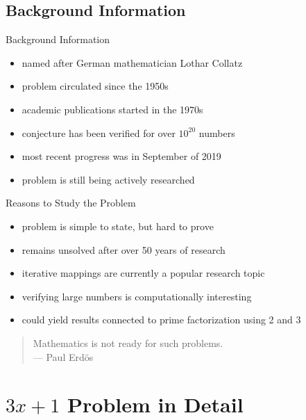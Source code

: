 \documentclass[hyperref={colorlinks,allcolors=black}]{beamer}
\begin{document}

\subsection[Background]{Background Information}

\begin{frame}{Background Information}
\begin{itemize}
    \item named after German mathematician Lothar Collatz
    \item problem circulated since the 1950s
    \item academic publications started in the 1970s
    \item conjecture has been verified for over $10^{20}$ numbers
    \item most recent progress was in September of 2019
    \item problem is still being actively researched
\end{itemize}
\end{frame}


\begin{frame}{Reasons to Study the Problem}
\begin{itemize}
    \item problem is simple to state, but hard to prove
    \item remains unsolved after over 50 years of research
    \item iterative mappings are currently a popular research topic
    \item verifying large numbers is computationally interesting
    \item could yield results connected to prime factorization using 2 and 3
\end{itemize}
\begin{quote}
Mathematics is not ready for such problems. \\ \flushright --- Paul Erdös
\end{quote}
\end{frame}


\section[Details]{$3x+1$ Problem in Detail}
\end{document}
